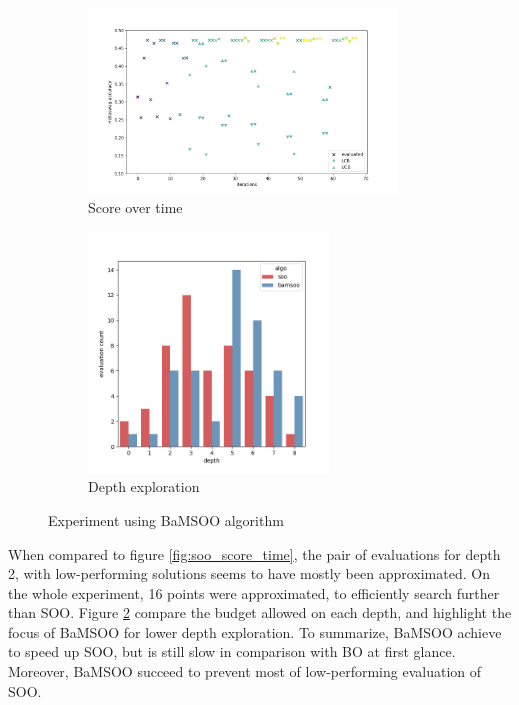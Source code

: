 \documentclass[runningheads]{llncs}
\begin{document}
\begin{figure}[h]
    \centering
    \begin{subfigure}[b]{.5\textwidth}
      \centering
      \includegraphics[width = 0.9\textwidth]{figures/bamsoo/score_evolution.png} 
      \caption{Score over time}
      \label{fig:bamsoo_score_time}
    \end{subfigure}%
    \begin{subfigure}[b]{.4\textwidth}
      \centering
      \includegraphics[width = 0.7\textwidth]{figures/bamsoo/depth_compar.png} 
      \caption{Depth exploration }
      \label{fig:bamsoo_soo_depth}
    \end{subfigure}
    \caption{Experiment using BaMSOO algorithm}
    \label{fig:bamsoo_res}
\end{figure}

When compared to figure \ref{fig:soo_score_time}, the pair of evaluations for depth 2, with low-performing solutions seems to have mostly been approximated. On the whole experiment, 16 points were approximated, to efficiently search further than SOO. Figure \ref{fig:bamsoo_soo_depth} compare the budget allowed on each depth, and highlight the focus of BaMSOO for lower depth exploration.
To summarize, BaMSOO achieve to speed up SOO, but is still slow in comparison with BO at first glance. Moreover, BaMSOO succeed to prevent most of low-performing evaluation of SOO.
\end{document}
